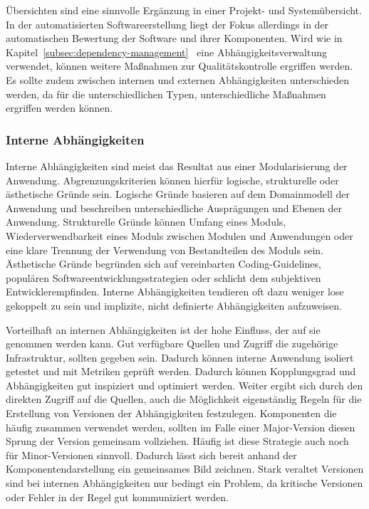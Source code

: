 Übersichten sind eine sinnvolle Ergänzung in einer Projekt- und Systemübersicht. In der automatisierten Softwareerstellung liegt der Fokus allerdings in der automatischen Bewertung der Software und ihrer Komponenten. Wird wie in Kapitel~\ref{subsec:dependency-management}~ eine Abhängigkeitsverwaltung verwendet, können weitere Maßnahmen zur Qualitätskontrolle ergriffen werden. Es sollte zudem zwischen internen und externen Abhängigkeiten unterschieden werden, da für die unterschiedlichen Typen, unterschiedliche Maßnahmen ergriffen werden können.

\subsubsection{Interne Abhängigkeiten}

Interne Abhängigkeiten sind meist das Resultat aus einer Modularisierung der Anwendung. Abgrenzungskriterien können hierfür logische, strukturelle oder ästhetische Gründe sein. Logische Gründe basieren auf dem Domainmodell der Anwendung und beschreiben unterschiedliche Ausprägungen und Ebenen der Anwendung. Strukturelle Gründe können Umfang eines Moduls, Wiederverwendbarkeit eines Moduls zwischen Modulen und Anwendungen oder eine klare Trennung der Verwendung von Bestandteilen des Moduls sein. Ästhetische Gründe begründen sich auf vereinbarten Coding-Guidelines, populären Softwareentwicklungsstrategien oder schlicht dem subjektiven Entwicklerempfinden. Interne Abhängigkeiten tendieren oft dazu weniger lose gekoppelt zu sein und implizite, nicht definierte Abhängigkeiten aufzuweisen.

Vorteilhaft an internen Abhängigkeiten ist der hohe Einfluss, der auf sie genommen werden kann. Gut verfügbare Quellen und Zugriff die zugehörige Infrastruktur, sollten gegeben sein. Dadurch können interne Anwendung isoliert getestet und mit Metriken geprüft werden. Dadurch können Kopplungsgrad und Abhängigkeiten gut inspiziert und optimiert werden. Weiter ergibt sich durch den direkten Zugriff auf die Quellen, auch die Möglichkeit eigenständig Regeln für die Erstellung von Versionen der Abhängigkeiten festzulegen. Komponenten die häufig zusammen verwendet werden, sollten im Falle einer Major-Version diesen Sprung der Version gemeinsam vollziehen. Häufig ist diese Strategie auch noch für Minor-Versionen sinnvoll. Dadurch lässt sich bereit anhand der Komponentendarstellung ein gemeinsames Bild zeichnen. Stark veraltet Versionen sind bei internen Abhängigkeiten nur bedingt ein Problem, da kritische Versionen oder Fehler in der Regel gut kommuniziert werden.

